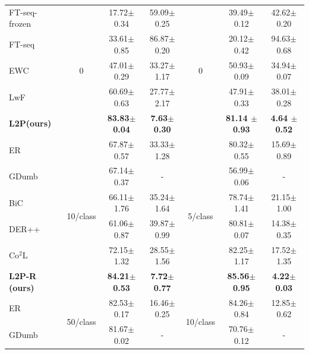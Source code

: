 \documentclass[10pt,twocolumn,letterpaper]{article}
\newcommand{\methodabbr}{L2P\xspace}
\begin{document}
\begin{table}[t]
\begin{center}
\begin{tabular}{l||c|cc||c|cc}
 FT-seq-frozen & \multirow{5}{*}{0} & 17.72\scriptsize{$\pm$0.34} & 59.09\scriptsize{$\pm$0.25} & \multirow{5}{*}{0} & 39.49\scriptsize{$\pm$0.12} & 42.62\scriptsize{$\pm$0.20} \\ 
 FT-seq & & 33.61\scriptsize{$\pm$0.85} & 86.87\scriptsize{$\pm$0.20} && 20.12\scriptsize{$\pm$0.42} & 94.63\scriptsize{$\pm$0.68} \\
 EWC \cite{kirkpatrick2017overcoming} & & 47.01\scriptsize{$\pm$0.29} & 33.27\scriptsize{$\pm$1.17} && 50.93\scriptsize{$\pm$0.09} & 34.94\scriptsize{$\pm$0.07} \\
 LwF \cite{li2017learning} & & 60.69\scriptsize{$\pm$0.63} & 27.77\scriptsize{$\pm$2.17} && 47.91\scriptsize{$\pm$0.33} & 38.01\scriptsize{$\pm$0.28} \\
 \textbf{\methodabbr (ours)} & & \bf{83.83\scriptsize{$\pm$0.04}} & \bf{7.63\scriptsize{$\pm$0.30}} && \bf{81.14 \scriptsize{$\pm$0.93}} & \bf{4.64 \scriptsize{$\pm$0.52}} \\
\midrule
   ER \cite{chaudhry2019tiny} & \multirow{6}{*}{10/class} & 67.87\scriptsize{$\pm$0.57} & 33.33\scriptsize{$\pm$1.28} & \multirow{6}{*}{5/class} & {80.32\scriptsize{$\pm$0.55}} & 15.69\scriptsize{$\pm$0.89} \\
  GDumb \cite{prabhu2020gdumb} & & 67.14\scriptsize{$\pm$0.37} & - && 56.99\scriptsize{$\pm$0.06} & - \\
 BiC \cite{wu2019large} & & 66.11\scriptsize{$\pm$1.76} & 35.24\scriptsize{$\pm$1.64} && 78.74\scriptsize{$\pm$1.41} & 21.15\scriptsize{$\pm$1.00} \\
 DER++ \cite{buzzega2020dark} & & 61.06\scriptsize{$\pm$0.87} & 39.87\scriptsize{$\pm$0.99} && 80.81\scriptsize{$\pm$0.07} & 14.38\scriptsize{$\pm$0.35} \\
 Co$^2$L \cite{cha2021co2l} & & 72.15\scriptsize{$\pm$1.32} & 28.55\scriptsize{$\pm$1.56} && 82.25\scriptsize{$\pm$1.17} & 17.52\scriptsize{$\pm$1.35} \\
 \textbf{\methodabbr-R (ours)} & & \bf{84.21\scriptsize{$\pm$0.53}} & \bf{7.72\scriptsize{$\pm$0.77}} && \bf{85.56\scriptsize{$\pm$0.95}} & \bf{4.22\scriptsize{$\pm$0.03}} \\
\midrule
  ER \cite{chaudhry2019tiny} &\multirow{6}{*}{50/class}& 82.53\scriptsize{$\pm$0.17} & 16.46\scriptsize{$\pm$0.25} &\multirow{6}{*}{10/class}& {84.26\scriptsize{$\pm$0.84}} & 12.85\scriptsize{$\pm$0.62} \\
 GDumb \cite{prabhu2020gdumb} & & 81.67\scriptsize{$\pm$0.02} & - && 70.76\scriptsize{$\pm$0.12} & - \\

\end{tabular}
\end{center}
\end{table}
\end{document}
